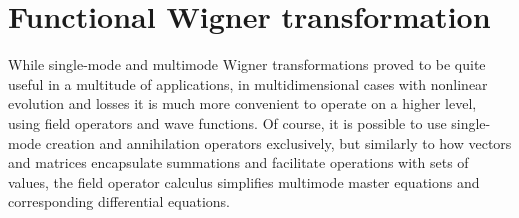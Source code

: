 \chapter{Functional Wigner transformation}
\label{cha:wigner}

While single-mode and multimode Wigner transformations proved to be quite useful in a multitude of applications, in multidimensional cases with nonlinear evolution and losses it is much more convenient to operate on a higher level, using field operators and wave functions.
Of course, it is possible to use single-mode creation and annihilation operators exclusively, but similarly to how vectors and matrices encapsulate summations and facilitate operations with sets of values, the field operator calculus simplifies multimode master equations and corresponding differential equations.




